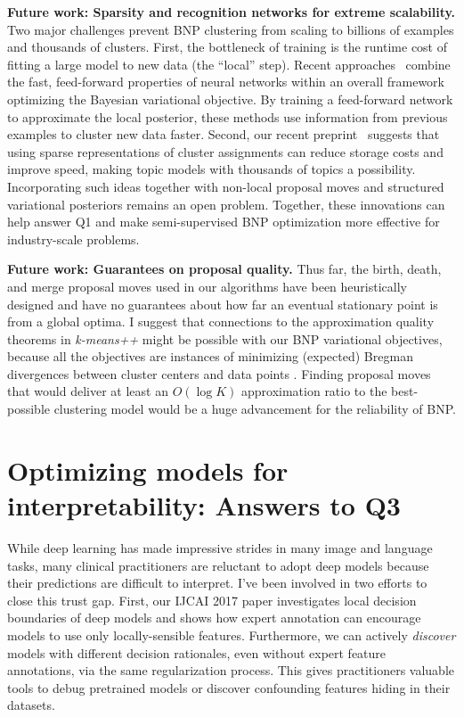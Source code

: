 \documentclass[11pt,letterpaper]{article}
\begin{document}
\textbf{Future work: Sparsity and recognition networks for extreme scalability.}
Two major challenges prevent BNP clustering from scaling to billions of examples and thousands of clusters. First, the bottleneck of training is the runtime cost of fitting a large model to new data (the ``local'' step). Recent approaches~\citep{gan2015deepTSBN,mnih2014neuralVariational} combine the fast, feed-forward properties of neural networks within an overall framework optimizing the Bayesian variational objective. By training a feed-forward network to approximate the local posterior, these methods use information from previous examples to cluster new data faster. 
Second, our recent preprint~\citep{hughes2016sparse} suggests that using sparse representations of cluster assignments can reduce storage costs and improve speed, making topic models with thousands of topics a possibility.
Incorporating such ideas together with non-local proposal moves and structured variational posteriors remains an open problem. Together, these innovations can help answer Q1 and make semi-supervised BNP optimization more effective for industry-scale problems.

\textbf{Future work: Guarantees on proposal quality.}
Thus far, the birth, death, and merge proposal moves used in our algorithms have been heuristically designed and have no guarantees about how far an eventual stationary point is from a global optima. I suggest that connections to the approximation quality theorems in \emph{k-means++} \citep{arthur2007kmeansplusplus} might be possible with our BNP variational objectives, because all the objectives are instances of minimizing (expected) Bregman divergences between cluster centers and data points \citep{ackermann2010bregmanplusplus}. Finding proposal moves that would deliver at least an $O(\log K)$ approximation ratio to the best-possible clustering model would be a huge advancement for the reliability of BNP.


\section{Optimizing models for interpretability: Answers to Q3}

While deep learning has made impressive strides in many image and language tasks, many clinical practitioners are reluctant to adopt deep models because their predictions are difficult to interpret.  
I've been involved in two efforts to close this trust gap. 
First, our IJCAI 2017 paper \citep{ross2017rrr} investigates local decision boundaries of deep models and shows how expert annotation can encourage models to use only locally-sensible features. Furthermore, we can actively \emph{discover} models with different decision rationales, even without expert feature annotations, via the same regularization process. This gives practitioners valuable tools to debug pretrained models or discover confounding features hiding in their datasets.
\end{document}
